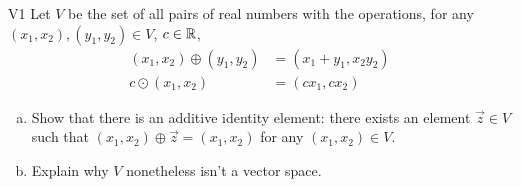 \begin{problem}{V1}
 Let \(V\) be the set of all pairs of real numbers with the operations, for any \((x_1,x_2), (y_1,y_2) \in V\), \(c\in \mathbb{R}\),
 \begin{align*}
 (x_1,x_2) \oplus (y_1,y_2) &= (x_1+y_1,x_2y_2) \\
 c \odot (x_1,x_2) &= (cx_1, cx_2)
 \end{align*}
 \begin{enumerate}[(a)]
 \item Show that there is an additive identity element:
       there exists an element \(\vec{z} \in V\) such that \((x_1,x_2)\oplus\vec{z}= (x_1,x_2)\) for any \( (x_1,x_2) \in V\).
\item Explain why \(V\) nonetheless isn't a vector space.
 \end{enumerate}
\end{problem}
